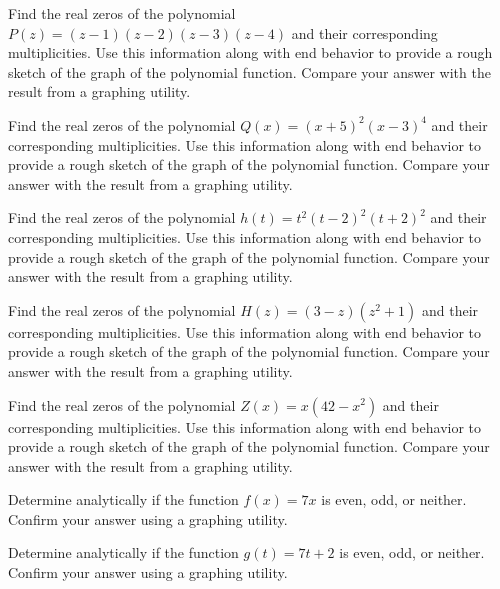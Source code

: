 \documentclass{ximera}
\begin{document}
\begin{problem}
Find the real zeros of the polynomial $P(z) = (z- 1)(z - 2)(z - 3)(z - 4)$ and their corresponding multiplicities.  Use this information along with end behavior to provide a rough sketch of the graph of the polynomial function.  Compare your answer with the result from a graphing utility.
\end{problem}


\begin{problem}
Find the real zeros of the polynomial $Q(x) = (x + 5)^{2}(x - 3)^{4}$ and their corresponding multiplicities.  Use this information along with end behavior to provide a rough sketch of the graph of the polynomial function.  Compare your answer with the result from a graphing utility.
\end{problem}

\begin{problem}
Find the real zeros of the polynomial $h(t) = t^2(t-2)^2(t+2)^2$ and their corresponding multiplicities.  Use this information along with end behavior to provide a rough sketch of the graph of the polynomial function.  Compare your answer with the result from a graphing utility.
\end{problem}

\begin{problem}
Find the real zeros of the polynomial $H(z) = (3-z)(z^2+1)$ and their corresponding multiplicities.  Use this information along with end behavior to provide a rough sketch of the graph of the polynomial function.  Compare your answer with the result from a graphing utility.
\end{problem}

\begin{problem}\label{zeromultgraphlast}
Find the real zeros of the polynomial $Z(x) = x(42 - x^{2})$ and their corresponding multiplicities.  Use this information along with end behavior to provide a rough sketch of the graph of the polynomial function.  Compare your answer with the result from a graphing utility.
\end{problem}

\begin{problem}\label{evenoddornotpolyfirst}
Determine analytically if the function $f(x) = 7x$ is even, odd, or neither.  Confirm your answer using a graphing utility.   
\end{problem}

\begin{problem}
Determine analytically if the function $g(t) = 7t + 2$ is even, odd, or neither.  Confirm your answer using a graphing utility.  
\end{problem}
 
\end{document}

